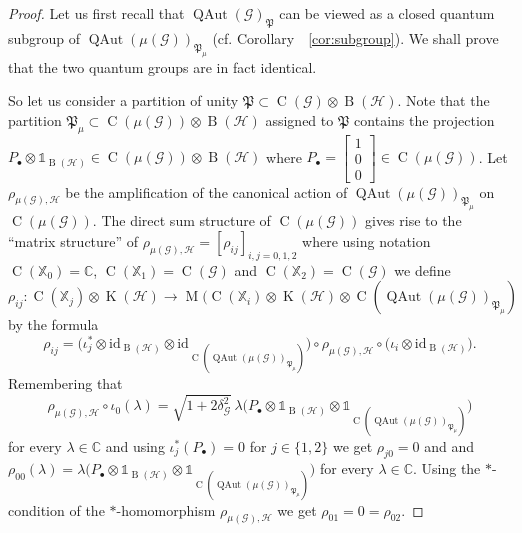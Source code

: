 \documentclass[11pt,reqno]{amsart}
\newcommand{\id}{\mathrm{id}}
\newcommand{\I}{\mathds{1}}
\newcommand{\CC}{\mathbb{C}}
\DeclareMathOperator{\QAut}{QAut}
\DeclareMathOperator{\B}{B}
\DeclareMathOperator{\C}{C}
\DeclareMathOperator{\M}{M}
\DeclareMathOperator{\K}{K}
\begin{document}
\begin{proof}
Let us first recall that $\QAut(\mathcal{G})_{\mathfrak{P}}$ can be viewed as a closed quantum subgroup of $\QAut(\mu(\mathcal{G}))_{\mathfrak{P}_{\mu}}$ (cf. Corollary~~\ref{cor:subgroup}). 
We shall prove that the two quantum groups are in fact identical. 

So let us consider a partition of unity $\mathfrak{P}\subset\C( \mathcal{G})\otimes\B(\mathscr{H})$. Note that  the partition  $\mathfrak{P}_{\mu}\subset\C(\mu(\mathcal{G}))\otimes\B(\mathscr{H})$ assigned to $\mathfrak{P}$  contains the projection $P_\bullet\otimes \I_{\B(\mathscr{H})}\in\C(\mu(\mathcal{G}))\otimes \B(\mathscr{H})$ where  $P_\bullet=\left[\begin{smallmatrix}1\\0\\0\end{smallmatrix}\right]\in\C(\mu(\mathcal{G}))$. Let $\rho_{\scriptscriptstyle\mu(\mathcal{G}),\mathscr{H}}$  be the   amplification of the canonical action of  $\QAut(\mu(\mathcal{G}))_{\mathfrak{P}_{\mu}}$ on $\C(\mu(\mathcal{G}))$. The  direct sum structure of $\C(\mu(\mathcal{G}))$ gives rise to the ``matrix structure'' of  $\rho_{{\scriptscriptstyle\mu(\mathcal{G}),\mathscr{H}}}=[\rho_{ij}]_{i,j=0,1,2}$ where  using notation $\C(\mathbb{X}_0)=\CC$, $\C(\mathbb{X}_1)=\C(\mathcal{G})$ and $\C(\mathbb{X}_2)=\C(\mathcal{G})$ we define $\rho_{ij}:\C(\mathbb{X}_j)\otimes\K(\mathscr{H})\to\M(\C(\mathbb{X}_i)\otimes \K(\mathscr{H})\otimes \C(\QAut(\mu(\mathcal{G}))_{\mathfrak{P}_{\mu}})$ by the formula 
\[
\rho_{ij} = \bigl(\iota_j^*\otimes\id_{\B(\mathscr{H})}\otimes \id_{\C(\QAut(\mu(\mathcal{G}))_{\mathfrak{P}_{\mu}})}\bigr)\circ\rho_{{\scriptscriptstyle\mu(\mathcal{G}),\mathscr{H}}}\circ\bigl(\iota_i\otimes\id_{\B(\mathscr{H})}\bigr).
\]
Remembering that
\[
\rho_{{\scriptscriptstyle\mu(\mathcal{G}),\mathscr{H}}}\circ\iota_0(\lambda) = \sqrt{1+2\delta_{\scriptscriptstyle\mathcal{G}}^2}\,\lambda \bigl(P_{\bullet}\otimes\I_{\B(\mathscr{H})}\otimes\I_{\C(\QAut(\mu(\mathcal{G}))_{\mathfrak{P}_{\mu}})}\bigr)
\]
for every $\lambda\in\mathbb{C}$ and using $\iota_{j}^*(P_{\bullet}) = 0$ for $j\in\{1,2\}$ we get $\rho_{j0} =0$ and and $\rho_{00}(\lambda) = \lambda \bigl(P_{\bullet}\otimes\I_{\B(\mathscr{H})}\otimes\I_{\C(\QAut(\mu(\mathcal{G}))_{\mathfrak{P}_{\mu}})}\bigr)$ for every $\lambda\in\CC$. 
Using the $*$-condition of the $*$-homomorphism $\rho_{\scriptscriptstyle\mu(\mathcal{G}),\mathscr{H}}$ we get $\rho_{01}=0=\rho_{02}$.


\end{proof}
\end{document}
